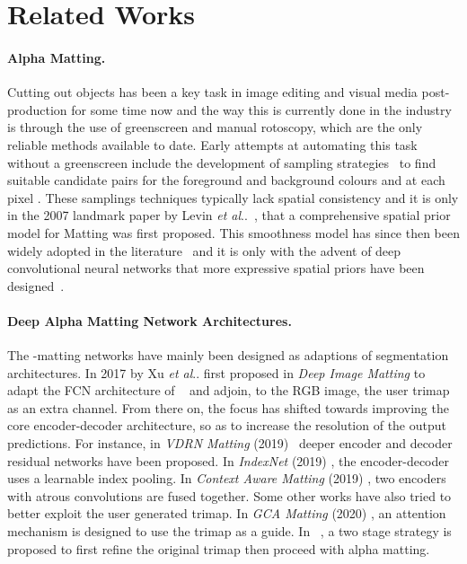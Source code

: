 \documentclass[runningheads]{llncs}
\makeatletter
\DeclareRobustCommand\onedot{\futurelet\@let@token\@onedot}
\def\@onedot{\ifx\@let@token.\else.\null\fi\xspace}
\def\etal{\emph{et al}\onedot}
\makeatother
\begin{document}
\section{Related Works}\label{sec:related-works}

\paragraph{Alpha Matting.}

Cutting out objects has been a key task in image editing and visual media
post-production for some time now and the way this is currently done in the
industry is through the use of greenscreen and manual rotoscopy, which are the
only reliable methods available to date. Early attempts at automating this task
without a greenscreen include the development of sampling
strategies~\cite{sharedMatting,comprehensiveSamplingMatting,klDivergenceMatting}
to find suitable candidate pairs for the foreground and background colours 
and  at each pixel . These samplings techniques typically lack spatial
consistency and it is only in the 2007 landmark paper by Levin
\etal~\cite{ClosedFormMattingPAMI}, that a comprehensive spatial prior model for
Matting was first proposed. This smoothness model has since then been widely
adopted in the literature~\cite{He11,Shahrian13,karacan2017alpha} and it is only
with the advent of deep convolutional neural networks that more expressive
spatial priors have been designed~\cite{DeepImageMatting,IndexMatting}.

\paragraph{Deep Alpha Matting Network Architectures.}

The -matting networks have mainly been designed as adaptions of
segmentation architectures. In 2017 by Xu \etal \cite{DeepImageMatting} first
proposed in \textit{Deep Image Matting} to adapt the FCN architecture of
~\cite{FCN} and adjoin, to the RGB image, the user trimap as an
extra channel. From there on, the focus has shifted towards improving the core
encoder-decoder architecture, so as to increase the resolution of the output
predictions. For instance, in \textit{VDRN Matting} (2019)~\cite{VDRNMatting}
deeper encoder and decoder residual networks have been proposed. In
\textit{IndexNet} (2019) \cite{IndexMatting}, the encoder-decoder uses a
learnable index pooling. In \textit{Context Aware Matting} (2019)
\cite{ContextMatting}, two encoders with atrous convolutions are fused
together. Some other works have also tried to better exploit the user
generated trimap. In \textit{GCA Matting} (2020) \cite{GCAMatting}, an attention
mechanism is designed to use the trimap as a guide. In ~\cite{DisentangledMatting}, a two stage strategy is proposed to first refine the original trimap then proceed with alpha matting.
\end{document}
